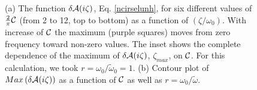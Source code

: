 \documentclass[letterpaper,twocolumn,amsmath,amssymb,floatfix,aps,superscriptaddress]{revtex4}
\begin{document}
\begin{figure}[t!]
\begin{center}
\begin{minipage}[b]{0.41\textwidth}
\begin{center}
\end{center}
\end{minipage}
\caption{(a) The function $\delta{\cal A}(i\zeta)$, Eq. \ref{ncirselunh}, for six different values of ${\frac{2}{\pi} {\cal C}}$ (from 2 to 12, top to bottom) as a function of $(\zeta/\omega_0)$. With increase of ${\cal C}$ the maximum (purple squares) moves from zero frequency toward non-zero values. The inset shows the complete dependence of the maximum of $\delta{\cal A}(i\zeta)$, $\zeta_{max}$, on $\cal C$. For this calculation, we took $r = \omega_0/\tilde\omega_0 = 1$. (b) Contour plot of $Max\left(\delta{\cal A}(i\zeta)\right)$ as a function of  ${\cal C}$ as well as $r = \omega_0/\tilde\omega$.}
\label{fiddle1}
\end{center}
\end{figure} 
\end{document}
